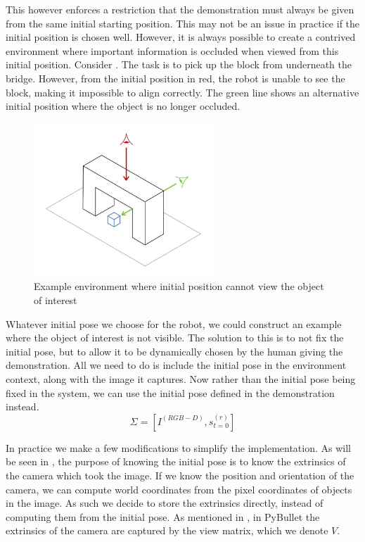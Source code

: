 This however enforces a restriction that the demonstration must always be given from the same initial starting position. This may not be an issue in practice if the initial position is chosen well. However, it is always possible to create a contrived environment where important information is occluded when viewed from this initial position. Consider . The task is to pick up the block from underneath the bridge. However, from the initial position in red, the robot is unable to see the block, making it impossible to align correctly. The green line shows an alternative initial position where the object is no longer occluded.\\

\begin{figure}[h]
    \centering
    \includegraphics[width=0.6\textwidth]{figures/occluded-no-bg.jpg}
    \caption{Example environment where initial position cannot view the object of interest}
    \label{fig:occluded}
\end{figure}

Whatever initial pose we choose for the robot, we could construct an example where the object of interest is not visible. The solution to this is to not fix the initial pose, but to allow it to be dynamically chosen by the human giving the demonstration. All we need to do is include the initial pose in the environment context, along with the image it captures. Now rather than the initial pose being fixed in the system, we can use the initial pose defined in the demonstration instead.
$$\Sigma = [I^{(RGB-D)}, s^{(r)}_{t=0}]$$

In practice we make a few modifications to simplify the implementation. As will be seen in , the purpose of knowing the initial pose is to know the extrinsics of the camera which took the image. If we know the position and orientation of the camera, we can compute world coordinates from the pixel coordinates of objects in the image. As such we decide to store the extrinsics directly, instead of computing them from the initial pose. As mentioned in , in PyBullet the extrinsics of the camera are captured by the view matrix, which we denote $V$.\\

